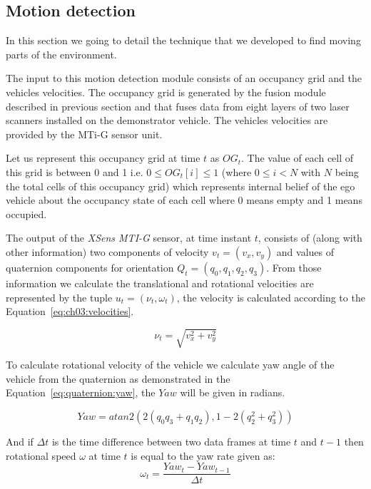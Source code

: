 \subsection{Motion detection}
\label{ch03:motiondetection}

In this section we going to detail the technique that we developed to find moving parts of the environment. 

The input to this motion detection module consists of an occupancy grid and the vehicles velocities. The occupancy grid is generated by the fusion module described in previous section and that fuses data from eight layers of two laser scanners installed on the demonstrator vehicle. The vehicles velocities are provided by the MTi-G sensor unit.

Let us represent this occupancy grid at time $t$ as  $OG_t$. The value of each cell of this grid is between 0 and 1 i.e. $0 \leq OG_t[i] \leq 1$ (where $0 \leq i<N$ with $N$ being the total cells of this occupancy grid) which represents internal belief of the ego vehicle about the occupancy state of each cell where 0 means empty and 1 means occupied.


The output of the \textit{XSens MTI-G} sensor, at time instant $t$,
consists of (along with other information) two components of velocity $v_t=(v_x, v_y)$ and values of
quaternion components for orientation $Q_t=(q_0, q_1, q_2, q_3)$. From those information we calculate the
translational and rotational velocities are represented by the tuple $u_t=(\nu_t, \omega_t)$, the velocity is calculated according to the Equation~\ref{eq:ch03:velocities}.

\begin{equation}
\label{eq:ch03:velocities}
\nu_t = \sqrt{v_x^2+v_y^2}
\end{equation}

To calculate rotational velocity of the vehicle we calculate yaw angle of the vehicle from the quaternion
as demonstrated in the Equation~\ref{eq:quaternion:yaw}, the $Yaw$ will be given in radians.

\begin{equation}
Yaw = atan2(2(q_0 q_3+q_1 q_2),1-2(q_2^2+q_3^2))
\label{eq:quaternion:yaw}
\end{equation}

And if $\Delta t$ is the time difference between two data frames at time $t$ and $t-1$ then rotational speed $\omega$
at time $t$ is equal to the yaw rate given as:
\begin{equation}
\omega_t = \frac{Yaw_t-Yaw_{t-1}}{\Delta t}
\label{eq:angular:velocity}
\end{equation}

